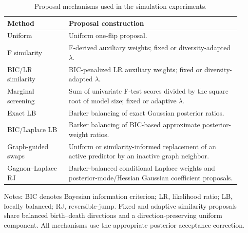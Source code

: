 \begin{table}[!t]
\centering
\caption{Proposal mechanisms used in the simulation experiments.}
\label{tab:simulation_methods}
\fontsize{12}{9}\selectfont
\begin{tabular}{@{}>{\raggedright\arraybackslash}p{0.25\linewidth}>{\raggedright\arraybackslash}p{0.70\linewidth}@{}}
\toprule
Method & Proposal construction \\
\midrule
Uniform & Uniform one-flip proposal. \\
F similarity & F-derived auxiliary weights; fixed or diversity-adapted $\lambda$. \\
BIC/LR similarity & BIC-penalized LR auxiliary weights; fixed or diversity-adapted $\lambda$. \\
Marginal screening & Sum of univariate F-test scores divided by the square root of model size; fixed or adaptive $\lambda$. \\
Exact LB & Barker balancing of exact Gaussian posterior ratios. \\
BIC/Laplace LB & Barker balancing of BIC-based approximate posterior-weight ratios. \\
Graph-guided swaps & Uniform or similarity-informed replacement of an active predictor by an inactive graph neighbor. \\
Gagnon--Laplace RJ & Barker-balanced conditional Laplace weights and posterior-mode/Hessian Gaussian coefficient proposals. \\
\bottomrule
\end{tabular}
\par\smallskip
\begin{minipage}{\linewidth}
\footnotesize
Notes: BIC denotes Bayesian information criterion; LR, likelihood ratio; LB, locally balanced; RJ, reversible-jump. Fixed and adaptive similarity proposals share balanced birth--death directions and a direction-preserving uniform component. All mechanisms use the appropriate posterior acceptance correction.
\end{minipage}
\end{table}
